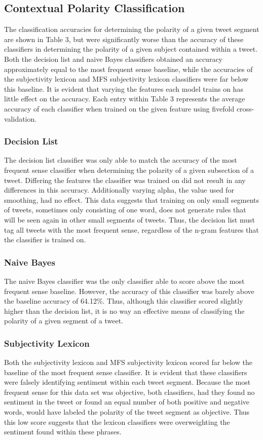 \documentclass[11pt]{article}
\begin{document}
\subsection{Contextual Polarity Classification}
The classification accuracies for determining the polarity of a given tweet segment are shown in Table 3, but were significantly worse than the accuracy of these classifiers in determining the polarity of a given subject contained within a tweet. Both the decision list and naive Bayes classifiers obtained an accuracy approximately equal to the most frequent sense baseline, while the accuracies of the subjectivity lexicon and MFS subjectivity lexicon classifiers were far below this baseline. It is evident that varying the features each model trains on has little effect on the accuracy. Each entry within Table 3 represents the average accuracy of each classifier when trained on the given feature using fivefold cross-validation.

\subsubsection{Decision List}
The decision list classifier was only able to match the accuracy of the most frequent sense classifier when determining the polarity of a given subsection of a tweet. Differing the features the classifier was trained on did not result in any differences in this accuracy. Additionally varying alpha, the value used for smoothing, had no effect. This data suggests that training on only small segments of tweets, sometimes only consisting of one word, does not generate rules that will be seen again in other small segments of tweets. Thus, the decision list must tag all tweets with the most frequent sense, regardless of the n-gram features that the classifier is trained on. 

\subsubsection{Naive Bayes}
The naive Bayes classifier was the only classifier able to score above the most frequent sense baseline. However, the accuracy of this classifier was barely above the baseline accuracy of 64.12\%. Thus, although this classifier scored slightly higher than the decision list, it is no way an effective means of classifying the polarity of a given segment of a tweet.

\subsubsection{Subjectivity Lexicon}
Both the subjectivity lexicon and MFS subjectivity lexicon scored far below the baseline of the most frequent sense classifier. It is evident that these classifiers were falsely identifying sentiment within each tweet segment. Because the most frequent sense for this data set was objective, both classifiers, had they found no sentiment in the tweet or found an equal number of both positive and negative words, would have labeled the polarity of the tweet segment as objective. Thus this low score suggests that the lexicon classifiers were overweighting the sentiment found within these phrases. 
\end{document}
